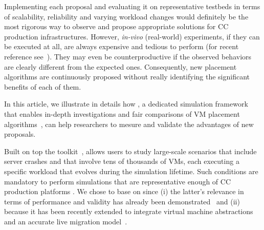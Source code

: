 Implementing each proposal and evaluating it on representative
testbeds in terms of scalability, reliability and varying workload
changes would definitely be the most rigorous way to observe and
propose appropriate solutions for CC production infrastructures.
However, \textit{in-vivo} (\ie real-world) experiments, if they can be
executed at all, are always expensive and tedious to perform (for
recent reference see~\cite{barker:pitfalls}). They may
even be counterproductive if the observed behaviors are clearly
different from the expected ones.
Consequently, new placement algorithms are continuously proposed
without really identifying the significant benefits of each of them.

In this article, we illustrate in details how \vmps, a dedicated simulation
framework that enables in-depth investigations and fair comparisons of VM placement
algorithms~\cite{vmplaces:europar15}, can help
researchers to mesure and validate the advantages of new proposals.

%
Built on top the \sg toolkit~\cite{casanova:hal-01017319},
\vmps allows users to study large-scale scenarios that include server crashes and that involve tens of thousands of VMs,
each executing a specific workload that evolves during the
simulation lifetime. Such conditions are mandatory to perform
simulations that are representative enough of CC production platforms
\cite{datacenterAsComputer,birke:nom2014,shen:ccgrid2015}.
%
We chose to base \vmps on \sg since (i) the latter's relevance in
terms of performance and validity has already been
demonstrated~\cite{simgridpub} and (ii) because it has been recently
extended to integrate virtual machine abstractions and an accurate live
migration model~\cite{Hirofuchi:2013:ALM:2568486.2568524}.



